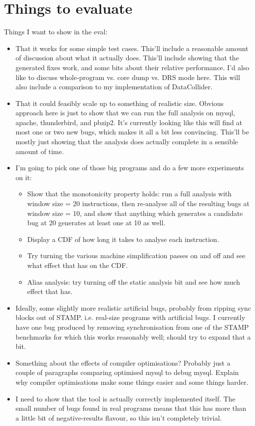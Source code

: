\section{Things to evaluate}

Things I want to show in the eval:

\begin{itemize}
\item That it works for some simple test cases.  This'll include a
  reasonable amount of discussion about what it actually does.
  This'll include showing that the generated fixes work, and some bits
  about their relative performance.  I'd also like to discuss
  whole-program vs. core dump vs. DRS mode here.  This will also
  include a comparison to my implementation of DataCollider.
\item That it could feasibly scale up to something of realistic size.
  Obvious approach here is just to show that we can run the full
  analysis on mysql, apache, thunderbird, and pbzip2.  It's currently
  looking like this will find at most one or two new bugs, which makes
  it all a bit less convincing.  This'll be mostly just showing that
  the analysis does actually complete in a sensible amount of time.
\item I'm going to pick one of those big programs and do a few more
  experiments on it:

  \begin{itemize}
  \item Show that the monotonicity property holds: run a full analysis
    with window size = 20 instructions, then re-analyse all of the
    resulting bugs at window size = 10, and show that anything which
    generates a candidate bug at 20 generates at least one at 10 as
    well.
  \item Display a CDF of how long it takes to analyse each instruction.
  \item Try turning the various machine simplification passes on and off
    and see what effect that has on the CDF.
  \item Alias analysis: try turning off the static analysis bit and
    see how much effect that has.
  \end{itemize}

\item Ideally, some slightly more realistic artificial bugs, probably
  from ripping sync blocks out of STAMP.  i.e. real-size programs with
  artificial bugs.  I currently have one bug produced by removing
  synchronisation from one of the STAMP benchmarks for which this
  works reasonably well; should try to expand that a bit.
\item Something about the effects of compiler optimisations?  Probably
  just a couple of paragraphs comparing optimised mysql to debug
  mysql.  Explain why compiler optimisations make some things easier
  and some things harder.
\item I need to show that the tool is actually correctly implemented
  itself.  The small number of bugs found in real programs means that
  this has more than a little bit of negative-results flavour, so this
  isn't completely trivial.
\end{itemize}

